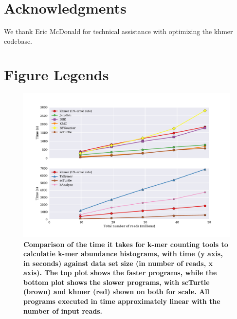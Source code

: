 \documentclass[10pt]{article}
\begin{document}
\section*{Acknowledgments}

We thank Eric McDonald for technical assistance with optimizing the khmer codebase.


%



\clearpage

\section*{Figure Legends}




\begin{figure}[!ht]
\centerline{\includegraphics[width=5in]{./figure/time_benchmark}}

\caption{\bf Comparison of the time it takes for k-mer counting tools
  to calculatie k-mer abundance histograms, with time (y axis, in
  seconds) against data set size (in number of reads, x axis).  The
  top plot shows the faster programs, while the bottom plot shows the
  slower programs, with scTurtle (brown) and khmer (red) shown on both
  for scale.  All programs executed in time approximately linear with
  the number of input reads.}

\label{fig:cmp_time}
\end{figure}
\end{document}
